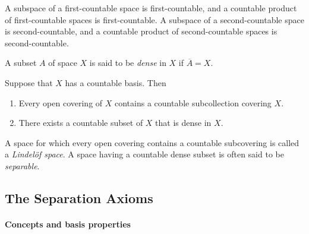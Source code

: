 \begin{theorem}
  A subspace of a first-countable space is first-countable, and a countable product of first-countable spaces is first-countable.
  A subspace of a second-countable space is second-countable, and a countable product of second-countable spaces is second-countable.
\end{theorem}

\begin{definition}
  A subset \( A \) of space \( X \) is said to be \emph{dense} in \( X \) if \( \overline{A} = X \).
\end{definition}

\begin{theorem}
  Suppose that \( X \) has a countable basis.
  Then
  \begin{enumerate}
    \item Every open covering of \( X \) contains a countable subcollection covering \( X \).
    \item There exists a countable subset of \( X \) that is dense in \( X \).
  \end{enumerate}
\end{theorem}

\begin{definition}
  A space for which every open covering contains a countable subcovering is called a \emph{Lindel\"{o}f space}.
  A space having a countable dense subset is often said to be \emph{separable}.
\end{definition}

\subsection{The Separation Axioms}

\paragraph{Concepts and basis properties}

